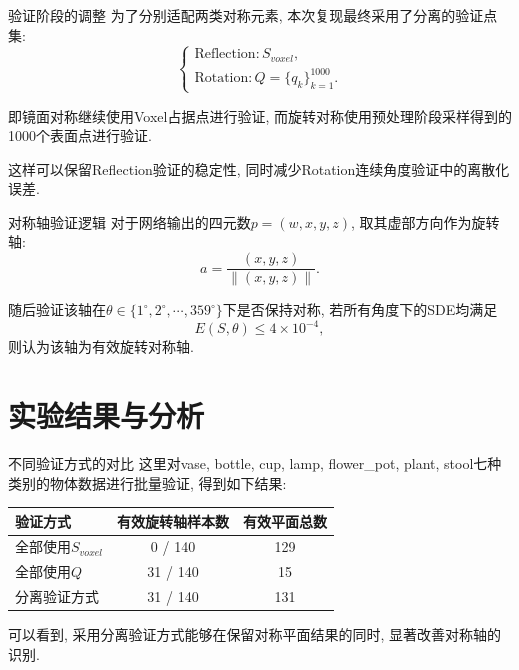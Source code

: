 \documentclass[UTF8, aspectratio=169, 11pt]{ctexbeamer}
\begin{document}
    \begin{frame}{验证阶段的调整}
        为了分别适配两类对称元素, 本次复现最终采用了分离的验证点集:
        \begin{equation}
            \begin{cases}
                \text{Reflection}: S_{voxel},\\
                \text{Rotation}: Q=\{q_k\}_{k=1}^{1000}.
            \end{cases}
        \end{equation}

        即镜面对称继续使用Voxel占据点进行验证, 而旋转对称使用预处理阶段采样得到的1000个表面点进行验证.

        这样可以保留Reflection验证的稳定性, 同时减少Rotation连续角度验证中的离散化误差.
    \end{frame}

    \begin{frame}{对称轴验证逻辑}
        对于网络输出的四元数$p=(w,x,y,z)$, 取其虚部方向作为旋转轴:
        \begin{equation}
            a=\frac{(x,y,z)}{\|(x,y,z)\|}.
        \end{equation}

        随后验证该轴在$\theta \in \{1^\circ,2^\circ,\cdots,359^\circ\}$下是否保持对称, 若所有角度下的SDE均满足
        \begin{equation}
            E(S,\theta)\leq 4\times 10^{-4},
        \end{equation}
        则认为该轴为有效旋转对称轴.
    \end{frame}

    \section{实验结果与分析}

    \begin{frame}{不同验证方式的对比}
        这里对vase, bottle, cup, lamp, flower\_pot, plant, stool七种类别的物体数据进行批量验证, 得到如下结果:
        \begin{table}
            \centering
            \begin{tabular}{lcc}
                \toprule
                验证方式 & 有效旋转轴样本数 & 有效平面总数 \\
                \midrule
                全部使用$S_{voxel}$ & 0 / 140 & 129 \\
                全部使用$Q$ & 31 / 140 & 15 \\
                分离验证方式 & 31 / 140 & 131 \\
                \bottomrule
            \end{tabular}
        \end{table}

        可以看到, 采用分离验证方式能够在保留对称平面结果的同时, 显著改善对称轴的识别.
    \end{frame}
\end{document}

